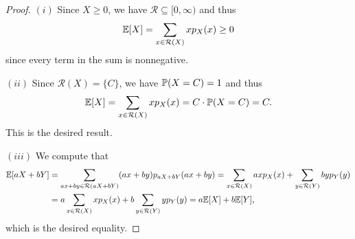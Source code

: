 \begin{proof}
  $(i)$ Since $X \ge 0$, we have $\mathcal{R} \subseteq [0, \infty)$
  and thus
  \[
    \mathbb{E}[X] = \sum_{x \in \mathcal{R}(X)} x p_X(x) \ge 0
  \]
  since every term in the sum is nonnegative.

  $(ii)$ Since $\mathcal{R}(X) = \{C\}$, we have
  $\mathbb{P}(X = C) = 1$ and thus
  \[
    \mathbb{E}[X] = \sum_{x \in \mathcal{R}(X)} x p_X(x)
    = C \cdot \mathbb{P}(X = C) = C.
  \]
  This is the desired result.

  $(iii)$ We compute that
  \begin{align*}
    \mathbb{E}[aX + bY]
    &= \sum_{ax + by \in \mathcal{R}(aX + bY)} (ax + by) p_{aX + bY}(ax + by)
    = \sum_{x \in \mathcal{R}(X)} ax p_{X}(x)
    + \sum_{y \in \mathcal{R}(Y)} by p_{Y}(y) \\
    &= a \sum_{x \in \mathcal{R}(X)} x p_{X}(x)
    + b \sum_{y \in \mathcal{R}(Y)} y p_{Y}(y)
    = a\mathbb{E}[X] + b\mathbb{E}[Y],
  \end{align*}
  which is the desired equality.
\end{proof}

